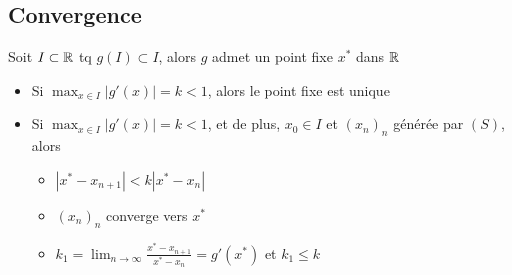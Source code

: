 \subsection{Convergence}
\begin{prop}
   Soit $I \subset \mathbb{R}$ tq $g(I) \subset I$, alors $g$ admet un point fixe  $x^*$ dans $\mathbb{R}$
   \begin{itemize}
       \item Si $\max_{x \in I} |g'(x)| = k < 1$, alors le point fixe est unique
       \item Si $\max_{x \in I} |g'(x)| = k < 1$, et de plus, $x_0 \in I$ et $(x_n)_n$ générée par  $(S)$, alors
            \begin{itemize}
               \item $|x^* - x_{n+1}| < k|x^* - x_n|$
               \item $(x_n)_n$ converge vers  $x^*$
               \item  $k_1 = \lim_{n \to \infty} \frac{x^* - x_{n+1}}{x^* - x_n} = g'(x^*)$ et $k_1 \le k$
           \end{itemize}
   \end{itemize}
\end{prop}
